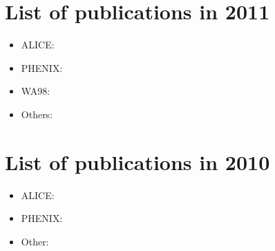 \documentclass[12pt]{article}
\begin{document}
\section{List of publications in 2011}

\begin{itemize}
\item ALICE:
\cite{
ALICE:2011ab,
Aamodt:2011gj,
Aamodt:2011zj,
Aamodt:2011kd,
Aamodt:2011mr,
Aamodt:2011zza,
Aamodt:2010cz,
Aamodt:2010jd,
Rak:2011zza}

\item PHENIX:
\cite{
Adare:2011sc,
Adare:2011tg,
Adare:2011yf,
Adare:2011vy,
Adare:2010ud,
Adare:2010mq,
Adare:2010fn,
Adare:2010cy,
Adare:2010cc,
Adare:2010xa,
Adare:2010fe,
Adare:2010de,
Adare:2010pt,
Adare:2011ht}
%

\item WA98:
\cite{
Collaboration:2011rsa}

\item Others:
\cite{Rak:2011zza}

\end{itemize}


\section{List of publications in 2010}

\begin{itemize}
\item ALICE:
\cite{
Aamodt:2010pa,
Aamodt:2010pb,
Aamodt:2010jj,
Aamodt:2010my,
Aamodt:2010dx,
Aamodt:2010pp,
Aamodt:2010ft,
Allen:2009aa,
Aamodt:2009aa}

\item PHENIX:
\cite{
Adare:2010bd,
Adare:2010sp,
Adare:2010yw,
Adare:2010dc,
Adare:2010ux,
Adare:2010ry,
Adare:2009js,
Adare:2009qk,
Adare:2009aa,
Adare:2008ab}

\item Other:
\cite{Allen:2009aa,
Kim:2010zj,
Muller:2010zzc}

\end{itemize}
\end{document}
